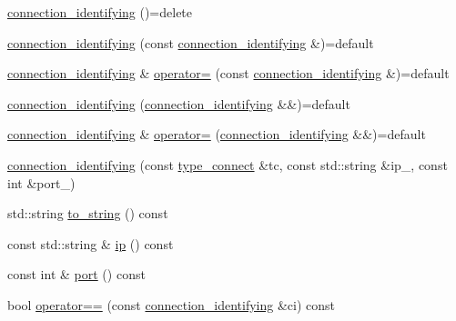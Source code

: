 \begin{DoxyCompactItemize}
\item 
\hyperlink{classactor__zeta_1_1network_1_1connection__identifying_a5d11dde1d79dea149d8d538814673469}{connection\+\_\+identifying} ()=delete
\item 
\hyperlink{classactor__zeta_1_1network_1_1connection__identifying_ae10d0797e40eeb071c5c2d5be418dc41}{connection\+\_\+identifying} (const \hyperlink{classactor__zeta_1_1network_1_1connection__identifying}{connection\+\_\+identifying} \&)=default
\item 
\hyperlink{classactor__zeta_1_1network_1_1connection__identifying}{connection\+\_\+identifying} \& \hyperlink{classactor__zeta_1_1network_1_1connection__identifying_ad7ad59f9a9d998f74662a73265292214}{operator=} (const \hyperlink{classactor__zeta_1_1network_1_1connection__identifying}{connection\+\_\+identifying} \&)=default
\item 
\hyperlink{classactor__zeta_1_1network_1_1connection__identifying_aa95dea5f31545f42ecb43625faea5f11}{connection\+\_\+identifying} (\hyperlink{classactor__zeta_1_1network_1_1connection__identifying}{connection\+\_\+identifying} \&\&)=default
\item 
\hyperlink{classactor__zeta_1_1network_1_1connection__identifying}{connection\+\_\+identifying} \& \hyperlink{classactor__zeta_1_1network_1_1connection__identifying_a9e526832959b3245dcf991ce6dbab047}{operator=} (\hyperlink{classactor__zeta_1_1network_1_1connection__identifying}{connection\+\_\+identifying} \&\&)=default
\item 
\hyperlink{classactor__zeta_1_1network_1_1connection__identifying_a4a1c2a18a3b7bca4a367c3adbf6aa023}{connection\+\_\+identifying} (const \hyperlink{namespaceactor__zeta_1_1network_a4046d5cb8c42554d5787ef4f0d5e3094}{type\+\_\+connect} \&tc, const std\+::string \&ip\+\_\+, const int \&port\+\_\+)
\item 
std\+::string \hyperlink{classactor__zeta_1_1network_1_1connection__identifying_a460e8e57e12ec47497a1a996de5ad82e}{to\+\_\+string} () const
\item 
const std\+::string \& \hyperlink{classactor__zeta_1_1network_1_1connection__identifying_a7acff7d7e92d95168db765ea7816954f}{ip} () const
\item 
const int \& \hyperlink{classactor__zeta_1_1network_1_1connection__identifying_aa5b0146888f91c56a74d96a9853788cf}{port} () const
\item 
bool \hyperlink{classactor__zeta_1_1network_1_1connection__identifying_ab283bc5ac9dcbddaad3140bfabe9f137}{operator==} (const \hyperlink{classactor__zeta_1_1network_1_1connection__identifying}{connection\+\_\+identifying} \&ci) const
\end{DoxyCompactItemize}


